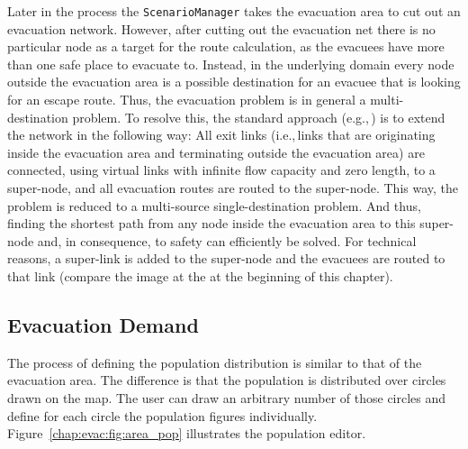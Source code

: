 Later in the process the \lstinline|ScenarioManager| takes the evacuation area to cut out an evacuation network. However, after cutting out the evacuation net there is no particular node as a target for the route calculation, as the evacuees have more than one safe place to evacuate to. Instead, in the underlying domain every node outside the evacuation area is a possible destination for an evacuee that is looking for an escape route. Thus, the evacuation problem is in general a multi-destination problem. To resolve this, the standard approach (e.g.,\,\citet{FordFulkerson1962FlowsInNetworks,LuGeorgeEtAl2005CapacityConstrainedRouting}) is to extend the network in the following way: All exit links (i.e.,\,links that are originating inside the evacuation area and terminating outside the evacuation area) are connected, using virtual links with infinite flow capacity and zero length, to a super-node, and all evacuation routes are routed to the super-node. This way, the problem is reduced to a multi-source single-destination problem. And thus, finding the shortest path from any node inside the evacuation area to this super-node and, in consequence, to safety can efficiently be solved. For technical reasons, a super-link is added to the super-node and the evacuees are routed to that link (compare the image at the at the beginning of this chapter).

\subsection{Evacuation Demand}
The process of defining the population distribution is similar to that of the evacuation area. The difference is that the population is distributed over circles drawn on the map. The user can draw an arbitrary number of those circles and define for each circle the population figures individually. Figure~\ref{chap:evac:fig:area_pop} illustrates the population editor. 

